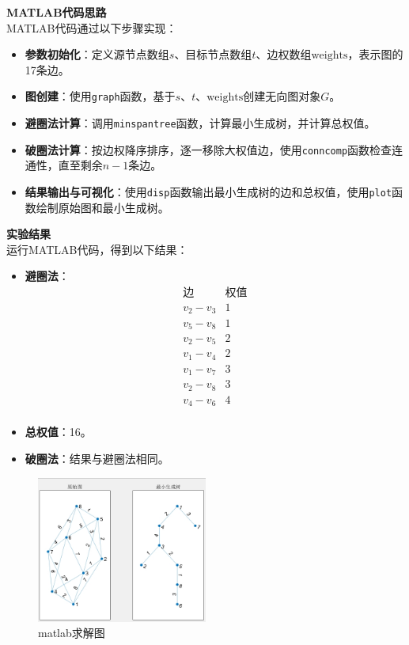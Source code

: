 \textbf{MATLAB代码思路}\\
MATLAB代码通过以下步骤实现：
\begin{itemize}
    \item \textbf{参数初始化}：定义源节点数组\( s \)、目标节点数组\( t \)、边权数组\( \text{weights} \)，表示图的17条边。
    \item \textbf{图创建}：使用\texttt{graph}函数，基于\( s \)、\( t \)、\( \text{weights} \)创建无向图对象\( G \)。
    \item \textbf{避圈法计算}：调用\texttt{minspantree}函数，计算最小生成树，并计算总权值。
    \item \textbf{破圈法计算}：按边权降序排序，逐一移除大权值边，使用\texttt{conncomp}函数检查连通性，直至剩余\( n-1 \)条边。
    \item \textbf{结果输出与可视化}：使用\texttt{disp}函数输出最小生成树的边和总权值，使用\texttt{plot}函数绘制原始图和最小生成树。
\end{itemize}

\textbf{实验结果}\\
运行MATLAB代码，得到以下结果：
\begin{itemize}
    \item \textbf{避圈法}：
    \[
    \begin{array}{ccc}
    \text{边} & \text{权值} \\
    \hline
    v_2 - v_3 & 1 \\
    v_5 - v_8 & 1 \\
    v_2 - v_5 & 2 \\
    v_1 - v_4 & 2 \\
    v_1 - v_7 & 3 \\
    v_2 - v_8 & 3 \\
    v_4 - v_6 & 4 \\
    \end{array}
    \]
    \item \textbf{总权值}：16。
    \item \textbf{破圈法}：结果与避圈法相同。
\end{itemize}
\begin{figure}[H]
    \centering
    \includegraphics[width=0.5\textwidth]{./hw9_image/12.png}
    \caption{matlab求解图}
    \label{fig:Chapter4_Temporary_Pavilion_1}
\end{figure}

